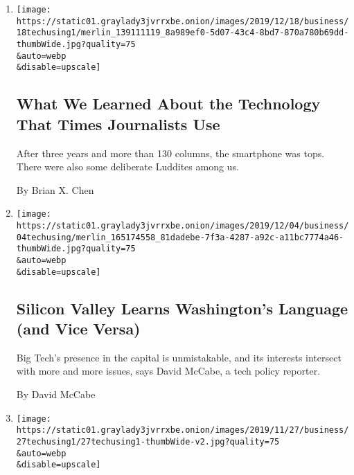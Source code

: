 \begin{enumerate}
\def\labelenumi{\arabic{enumi}.}
\item
  \href{/2019/12/18/technology/personaltech/technology-times-journalists-use.html}{}

  \texttt{[image: https://static01.graylady3jvrrxbe.onion/images/2019/12/18/business/18techusing1/merlin\_139111119\_8a989ef0-5d07-43c4-8bd7-870a780b69dd-thumbWide.jpg?quality=75\\\&auto=webp\\\&disable=upscale]}

  \hypertarget{what-we-learned-about-the-technology-that-times-journalists-use}{%
  \subsection{What We Learned About the Technology That Times
  Journalists
  Use}\label{what-we-learned-about-the-technology-that-times-journalists-use}}

  After three years and more than 130 columns, the smartphone was tops.
  There were also some deliberate Luddites among us.

  By Brian X. Chen
\item
  \href{/2019/12/04/technology/personaltech/silicon-valley-washington.html}{}

  \texttt{[image: https://static01.graylady3jvrrxbe.onion/images/2019/12/04/business/04techusing/merlin\_165174558\_81dadebe-7f3a-4287-a92c-a11bc7774a46-thumbWide.jpg?quality=75\\\&auto=webp\\\&disable=upscale]}

  \hypertarget{silicon-valley-learns-washingtons-language-and-vice-versa}{%
  \subsection{Silicon Valley Learns Washington's Language (and Vice
  Versa)}\label{silicon-valley-learns-washingtons-language-and-vice-versa}}

  Big Tech's presence in the capital is unmistakable, and its interests
  intersect with more and more issues, says David McCabe, a tech policy
  reporter.

  By David McCabe
\item
  \href{/2019/11/27/technology/personaltech/young-tech-users.html}{}

  \texttt{[image: https://static01.graylady3jvrrxbe.onion/images/2019/11/27/business/27techusing1/27techusing1-thumbWide-v2.jpg?quality=75\\\&auto=webp\\\&disable=upscale]}

  \hypertarget{a-big-screen-to-sift-through-recruits}{%
}
\end{enumerate}
